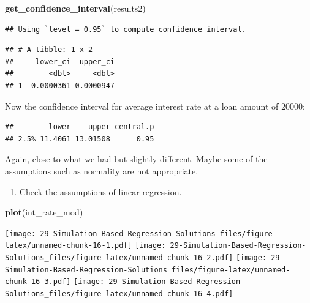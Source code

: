 \documentclass[
]{book}
\newenvironment{Shaded}{\begin{snugshade}}{\end{snugshade}}
\newcommand{\DataTypeTok}[1]{\textcolor[rgb]{0.13,0.29,0.53}{#1}}
\newcommand{\DecValTok}[1]{\textcolor[rgb]{0.00,0.00,0.81}{#1}}
\newcommand{\KeywordTok}[1]{\textcolor[rgb]{0.13,0.29,0.53}{\textbf{#1}}}
\newcommand{\NormalTok}[1]{#1}
\newcommand{\OperatorTok}[1]{\textcolor[rgb]{0.81,0.36,0.00}{\textbf{#1}}}
\newcommand{\StringTok}[1]{\textcolor[rgb]{0.31,0.60,0.02}{#1}}
\providecommand{\tightlist}{%
  \setlength{\itemsep}{0pt}\setlength{\parskip}{0pt}}
\begin{document}
\begin{Shaded}
\begin{Highlighting}[]
\KeywordTok{get_confidence_interval}\NormalTok{(results2)}
\end{Highlighting}
\end{Shaded}

\begin{verbatim}
## Using `level = 0.95` to compute confidence interval.
\end{verbatim}

\begin{verbatim}
## # A tibble: 1 x 2
##     lower_ci  upper_ci
##        <dbl>     <dbl>
## 1 -0.0000361 0.0000947
\end{verbatim}

Now the confidence interval for average interest rate at a loan amount of 20000:

\begin{Shaded}
\end{Shaded}

\begin{verbatim}
##        lower    upper central.p
## 2.5% 11.4061 13.01508      0.95
\end{verbatim}

Again, close to what we had but slightly different. Maybe some of the assumptions such as normality are not appropriate.

\begin{enumerate}
\def\labelenumi{\alph{enumi}.}
\setcounter{enumi}{6}
\tightlist
\item
  Check the assumptions of linear regression.
\end{enumerate}

\begin{Shaded}
\begin{Highlighting}[]
\KeywordTok{plot}\NormalTok{(int_rate_mod)}
\end{Highlighting}
\end{Shaded}

\texttt{[image: 29-Simulation-Based-Regression-Solutions\_files/figure-latex/unnamed-chunk-16-1.pdf]} \texttt{[image: 29-Simulation-Based-Regression-Solutions\_files/figure-latex/unnamed-chunk-16-2.pdf]} \texttt{[image: 29-Simulation-Based-Regression-Solutions\_files/figure-latex/unnamed-chunk-16-3.pdf]} \texttt{[image: 29-Simulation-Based-Regression-Solutions\_files/figure-latex/unnamed-chunk-16-4.pdf]}
\end{document}
